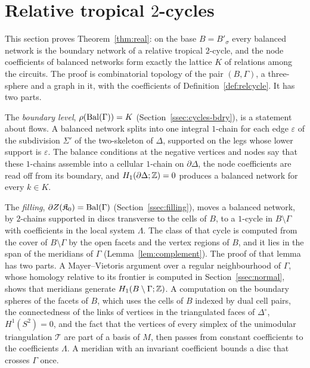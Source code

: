 \section{Relative tropical \texorpdfstring{$2$}{2}-cycles}\label{sec:cycles}


This section proves Theorem~\ref{thm:real}: on the base $B=B'_\sigma$ every balanced network is the boundary network
of a relative tropical $2$-cycle, and the node coefficients of balanced networks form exactly the lattice $K$ of
relations among the circuits. The proof is combinatorial topology of the pair $(B,\Gamma)$, a three-sphere and a
graph in it, with the coefficients of Definition~\ref{def:relcycle}. It has two parts.

The \emph{boundary level}, $\rho(\mathrm{Bal}(\Gamma))=K$ (Section~\ref{ssec:cycles-bdry}), is a statement about flows. A balanced
network splits into one integral $1$-chain for each edge $\varepsilon$ of the subdivision $\Sigma'$ of the two-skeleton
of $\Delta$, supported on the legs whose lower support is $\varepsilon$. The balance conditions at the negative vertices
and nodes say that these $1$-chains assemble into a cellular $1$-chain on $\partial\Delta$, the node coefficients are
read off from its boundary, and $H_1(\partial\Delta;\mathbb Z)=0$ produces a balanced network for every $k\in K$.

The \emph{filling}, $\partial Z(\mathfrak K_0)=\mathrm{Bal}(\Gamma)$ (Section~\ref{ssec:filling}), moves a balanced network, by
$2$-chains supported in discs transverse to the cells of $B$, to a $1$-cycle in $B\setminus\Gamma$ with coefficients in
the local system $\Lambda$. The class of that cycle is computed from the cover of $B\setminus\Gamma$ by the open facets
and the vertex regions of $B$, and it lies in the span of the meridians of $\Gamma$ (Lemma~\ref{lem:complement}). The
proof of that lemma has two parts. A Mayer--Vietoris argument over a regular neighbourhood of $\Gamma$, whose homology
relative to its frontier is computed in Section~\ref{ssec:normal}, shows that meridians generate $H_1(B\setminus\Gamma;\mathbb Z)$.
A computation on the boundary spheres of the facets of $B$, which uses the cells of $B$ indexed by dual cell pairs, the connectedness of
the links of vertices in the triangulated faces of $\Delta^\circ$, $H^1(S^2)=0$, and the fact that the vertices of every
simplex of the unimodular triangulation $\mathcal T$ are part of a basis of $M$, then passes from constant coefficients to
the coefficients $\Lambda$. A meridian with an invariant coefficient bounds a disc that crosses $\Gamma$ once.


